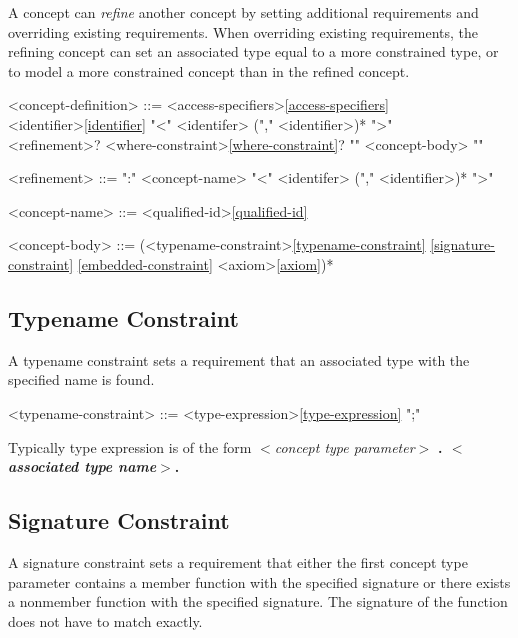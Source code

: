 \documentclass[a4paper,oneside,11pt]{article}
\begin{document}
A concept can \emph{refine} another concept by setting additional requirements and overriding existing requirements.
When overriding existing requirements, the refining concept can set an associated type equal to a more constrained type,
or to model a more constrained concept than in the refined concept.

\begin{grammar}
\label{concept-definition}<concept-definition> ::= <access-specifiers>\ref{access-specifiers}\\
 <identifier>\ref{identifier} "<" <identifer> ("," <identifier>)* ">"\\
<refinement>? <where-constraint>\ref{where-constraint}? "{" <concept-body> "}"

<refinement> ::= ":" <concept-name> "<" <identifer> ("," <identifier>)* ">"

\label{concept-name}<concept-name> ::= <qualified-id>\ref{qualified-id}

<concept-body> ::= (<typename-constraint>\ref{typename-constraint}
\ref{signature-constraint}
\ref{embedded-constraint}
\alt <axiom>\ref{axiom})*
\end{grammar}

\subsection{Typename Constraint}

A typename constraint sets a requirement that an associated type with the specified name is found.

\begin{grammar}
\label{typename-constraint}<typename-constraint> ::=  <type-expression>\ref{type-expression} ";"
\end{grammar}

Typically type expression is of the form \emph{$<$concept type parameter$>$} \bf{.} \emph{$<$associated type name$>$}.

\subsection{Signature Constraint}

A signature constraint sets a requirement that either the first concept type parameter contains a member function with the specified signature or there exists a nonmember function with the specified signature.
The signature of the function does not have to match exactly.
\end{document}
